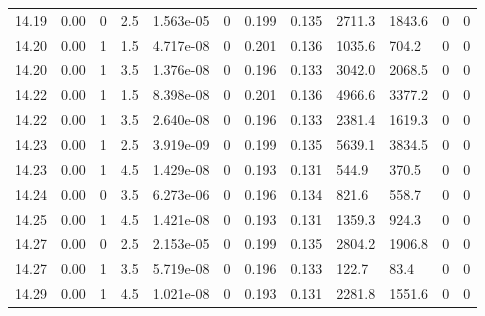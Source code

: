 \documentclass[preview]{standalone}
\begin{document}
{{{{{{{{{{{{{{\begin{tabular}{L{1.2cm}C{1.2cm} C{0.3cm}C{0.5cm} C{1.4cm}C{1.4cm} C{1.4cm}C{1.4cm} C{1.6cm}C{1.6cm} C{1.6cm}C{1.6cm}}
  14.19  &  0.00  & 0     & 2.5 &  1.563e-05  & 0  &  0.199&   0.135& 2711.3 & 1843.6   &  0 & 0  \\ 
  14.20  &  0.00  & 1     & 1.5 &  4.717e-08  & 0  &  0.201&   0.136& 1035.6 & 704.2   &  0 & 0  \\ 
  14.20  &  0.00  & 1     & 3.5 &  1.376e-08  & 0  &  0.196&   0.133& 3042.0 & 2068.5   &  0 & 0  \\ 
  14.22  &  0.00  & 1     & 1.5 &  8.398e-08  & 0  &  0.201&   0.136& 4966.6 & 3377.2   &  0 & 0  \\ 
  14.22  &  0.00  & 1     & 3.5 &  2.640e-08  & 0  &  0.196&   0.133& 2381.4 & 1619.3   &  0 & 0  \\ 
  14.23  &  0.00  & 1     & 2.5 &  3.919e-09  & 0  &  0.199&   0.135& 5639.1 & 3834.5   &  0 & 0  \\ 
  14.23  &  0.00  & 1     & 4.5 &  1.429e-08  & 0  &  0.193&   0.131& 544.9 & 370.5   &  0 & 0  \\ 
  14.24  &  0.00  & 0     & 3.5 &  6.273e-06  & 0  &  0.196&   0.134& 821.6 & 558.7   &  0 & 0  \\ 
  14.25  &  0.00  & 1     & 4.5 &  1.421e-08  & 0  &  0.193&   0.131& 1359.3 & 924.3   &  0 & 0  \\ 
  14.27  &  0.00  & 0     & 2.5 &  2.153e-05  & 0  &  0.199&   0.135& 2804.2 & 1906.8   &  0 & 0  \\ 
  14.27  &  0.00  & 1     & 3.5 &  5.719e-08  & 0  &  0.196&   0.133& 122.7 & 83.4   &  0 & 0  \\ 
  14.29  &  0.00  & 1     & 4.5 &  1.021e-08  & 0  &  0.193&   0.131& 2281.8 & 1551.6   &  0 & 0  \\ 
\hline 
\end{tabular} 

}}}}}}}}}}}}}}
\end{document}
